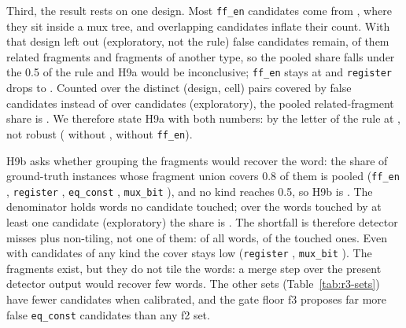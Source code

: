 \documentclass[conference]{IEEEtran}
\newcommand{\code}[1]{\texttt{#1}}
\begin{document}
Third, the result rests on one design. Most \code{ff\_en} candidates come from
\code{\rttNineTopDesign}, where they sit inside a mux tree, and overlapping candidates inflate
their count. With that design left out (exploratory, not the rule) \rttNineTopFalse{} false
candidates remain, \rttNineTopFrag{} of them related fragments and \rttNineTopOther{} fragments of
another type, so the pooled share falls under the 0.5 of the rule and H9a would be inconclusive;
\code{ff\_en} stays at \rttNineTopFfenFrag{} and \code{register} drops to
\rttNineTopRegisterFrag. Counted over the \rttNineCells{} distinct (design, cell) pairs covered by
false candidates instead of over candidates (exploratory), the pooled related-fragment share is
\rttNineCellFrag. We therefore state H9a with both numbers: \rttLNineaStatus{} by the letter of the
rule at \rttNinePoolFrag, not robust (\rttNineTopFrag{} without \code{\rttNineTopDesign},
\rttNineNoFfenFrag{} without \code{ff\_en}).

H9b asks whether grouping the fragments would recover the word: the share of ground-truth
instances whose fragment union covers 0.8 of them is
\rttNinePoolQ{} pooled (\code{ff\_en} \rttNineFfenQ, \code{register} \rttNineRegisterQ,
\code{eq\_const} \rttNineEqconstQ, \code{mux\_bit} \rttNineMuxbitQ), and no kind reaches 0.5, so
H9b is \rttLNinebStatus. The denominator holds words no candidate touched; over the
\rttNinePoolTouched{} words touched by at least one candidate (exploratory) the share is
\rttNinePoolQTouched. The shortfall is therefore detector misses plus non-tiling, not one of them:
\rttNinePoolQ{} of all words, \rttNinePoolQTouched{} of the touched ones. Even with candidates of any
kind the cover stays low (\code{register} \rttNineRegisterAny, \code{mux\_bit} \rttNineMuxbitAny).
The fragments exist, but they do not tile the words: a merge step over the present detector
output would recover few words. The other sets (Table~\ref{tab:r3-sets}) have fewer candidates
when calibrated, and the gate floor f3 proposes far more false \code{eq\_const} candidates than
any f2 set.



\end{document}
